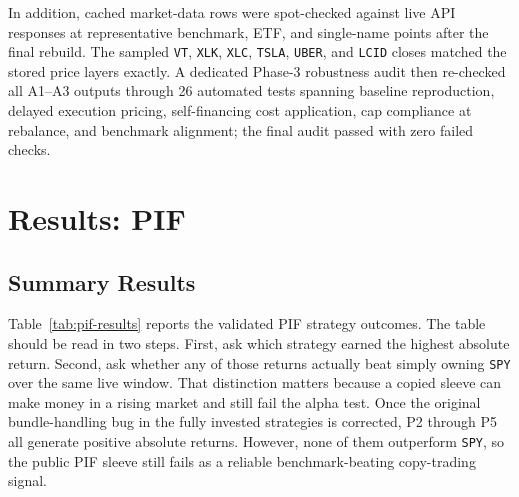 \documentclass[conference]{IEEEtran}
\begin{document}
In addition, cached market-data rows were spot-checked against live API responses at representative benchmark, ETF, and single-name points after the final rebuild. The sampled \texttt{VT}, \texttt{XLK}, \texttt{XLC}, \texttt{TSLA}, \texttt{UBER}, and \texttt{LCID} closes matched the stored price layers exactly. A dedicated Phase-3 robustness audit then re-checked all A1--A3 outputs through 26 automated tests spanning baseline reproduction, delayed execution pricing, self-financing cost application, cap compliance at rebalance, and benchmark alignment; the final audit passed with zero failed checks.

\section{Results: PIF}

\subsection{Summary Results}

Table~\ref{tab:pif-results} reports the validated PIF strategy outcomes. The table should be read in two steps. First, ask which strategy earned the highest absolute return. Second, ask whether any of those returns actually beat simply owning \texttt{SPY} over the same live window. That distinction matters because a copied sleeve can make money in a rising market and still fail the alpha test. Once the original bundle-handling bug in the fully invested strategies is corrected, P2 through P5 all generate positive absolute returns. However, none of them outperform \texttt{SPY}, so the public PIF sleeve still fails as a reliable benchmark-beating copy-trading signal.

\begin{table}[!t]
\caption{PIF Strategy Results versus SPY}
\label{tab:pif-results}
\centering
\small
\setlength{\tabcolsep}{5pt}
\end{table}
\end{document}

